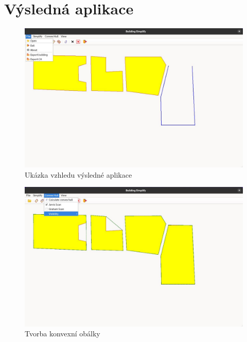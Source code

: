 
\section{Výsledná aplikace}

\begin{figure}[H]
    \centering
    \includegraphics[width=\textwidth]{images/Ukazaka_aplikace.JPG}
    \caption{Ukázka vzhledu výsledné aplikace}
\end{figure}

\begin{figure}[H]
    \centering
    \includegraphics[width=\textwidth]{images/Ukazaka_ch.JPG}
    \caption{Tvorba konvexní obálky}
\end{figure}

